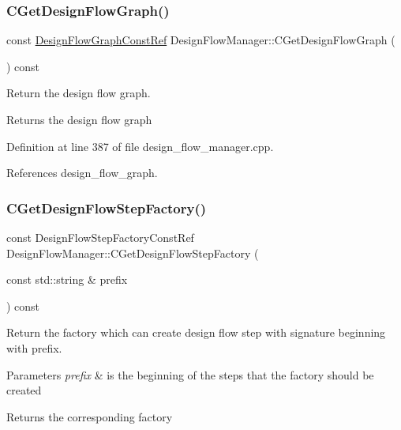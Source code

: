 \subsubsection{\texorpdfstring{C\+Get\+Design\+Flow\+Graph()}{CGetDesignFlowGraph()}}
{\footnotesize\ttfamily const \hyperlink{design__flow__graph_8hpp_a0230319e566e6824d3d187b6871598f7}{Design\+Flow\+Graph\+Const\+Ref} Design\+Flow\+Manager\+::\+C\+Get\+Design\+Flow\+Graph (\begin{DoxyParamCaption}{ }\end{DoxyParamCaption}) const}



Return the design flow graph. 

\begin{DoxyReturn}{Returns}
the design flow graph 
\end{DoxyReturn}


Definition at line 387 of file design\+\_\+flow\+\_\+manager.\+cpp.



References design\+\_\+flow\+\_\+graph.

\mbox{\label{classDesignFlowManager_af6188161209a658023cd0c26dae9d4ca}} 
\subsubsection{\texorpdfstring{C\+Get\+Design\+Flow\+Step\+Factory()}{CGetDesignFlowStepFactory()}}
{\footnotesize\ttfamily const Design\+Flow\+Step\+Factory\+Const\+Ref Design\+Flow\+Manager\+::\+C\+Get\+Design\+Flow\+Step\+Factory (\begin{DoxyParamCaption}\item[{const std\+::string \&}]{prefix }\end{DoxyParamCaption}) const}



Return the factory which can create design flow step with signature beginning with prefix. 


\begin{DoxyParams}{Parameters}
{\em prefix} & is the beginning of the steps that the factory should be created \\
\hline
\end{DoxyParams}
\begin{DoxyReturn}{Returns}
the corresponding factory 
\end{DoxyReturn}


